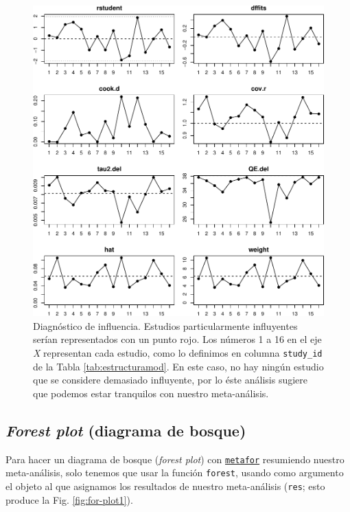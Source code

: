 \documentclass[
  bookmarksnumbered]{article}
\begin{document}
\begin{figure}
\centering
\includegraphics{Meta-analysis_files/figure-latex/infplot-1.pdf}
\caption{\label{fig:infplot}Diagnóstico de influencia. Estudios particularmente influyentes serían representados con un punto rojo. Los números 1 a 16 en el eje \emph{X} representan cada estudio, como lo definimos en columna \texttt{study\_id} de la Tabla \ref{tab:estructuramod}. En este caso, no hay ningún estudio que se considere demasiado influyente, por lo éste análisis sugiere que podemos estar tranquilos con nuestro meta-análisis.}
\end{figure}

\hypertarget{forest-plot-diagrama-de-bosque}{%
\subsection{\texorpdfstring{\emph{Forest plot} (diagrama de bosque)}{Forest plot (diagrama de bosque)}}\label{forest-plot-diagrama-de-bosque}}

Para hacer un diagrama de bosque (\emph{forest plot}) con \href{https://www.metafor-project.org/doku.php}{\texttt{metafor}} resumiendo nuestro meta-análisis, solo tenemos que usar la función \texttt{forest}, usando como argumento el objeto al que asignamos los resultados de nuestro meta-análisis (\texttt{res}; esto produce la Fig. \ref{fig:for-plot1}).
\end{document}
